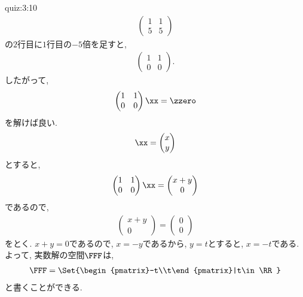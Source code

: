 \begin{answerof}{quiz:3:10} 
  \begin{align*}
    \begin{pmatrix}1&1\\5&5\end{pmatrix}
  \end{align*}
  の$2$行目に$1$行目の$-5$倍を足すと,
 \begin{align*}
    \begin{pmatrix}1&1\\0&0\end{pmatrix}.
  \end{align*}
 したがって,
  \begin{align*}
    \begin{pmatrix}1&1\\0&0\end{pmatrix}
    \xx=\zzero
  \end{align*}
  を解けば良い.
  \begin{align*}
    \xx=
    \begin{pmatrix}x\\y\end{pmatrix}
  \end{align*}
  とすると,
  \begin{align*}
    \begin{pmatrix}1&1\\0&0\end{pmatrix}
      \xx
      =
    \begin{pmatrix}x+y\\0\end{pmatrix}
  \end{align*}
  であるので,
  \begin{align*}
    \begin{pmatrix}x+y\\0\end{pmatrix}=
      \begin{pmatrix}0\\0\end{pmatrix}
  \end{align*}
  をとく. $x+y=0$であるので,
  $x=-y$であるから,
  $y=t$とすると, $x=-t$である.
  よって, 実数解の空間$\FFF$は,
  \begin{align*}
    \FFF=
    \Set{\begin{pmatrix}-t\\t\end{pmatrix}|t\in\RR}
  \end{align*}
  と書くことができる.  
\end{answerof}

